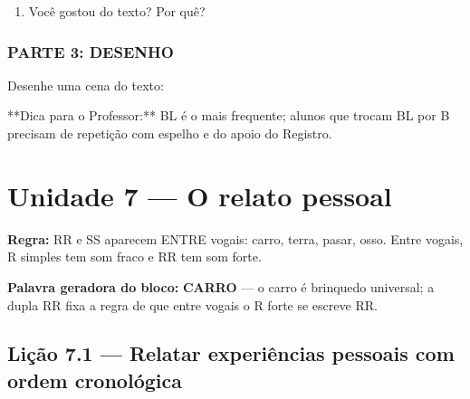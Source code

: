 \begin{exercicio}
\begin{enumerate}
  \item Você gostou do texto? Por quê?
  \begin{center}
  \underline{\hspace{12cm}}
  \end{center}

\end{enumerate}

\subsection*{PARTE 3: DESENHO}

Desenhe uma cena do texto:

\begin{center}
\end{center}

\end{exercicio}

\begin{dica}
**Dica para o Professor:** BL é o mais frequente; alunos que trocam BL por B precisam de repetição com espelho e do apoio do Registro.
\end{dica}


\chapter{Unidade 7 --- O relato pessoal}


\textbf{Regra:} RR e SS aparecem ENTRE vogais: carro, terra, pasar, osso. Entre vogais, R simples tem som fraco e RR tem som forte.

\textbf{Palavra geradora do bloco:} \textbf{CARRO} --- o carro é brinquedo universal; a dupla RR fixa a regra de que entre vogais o R forte se escreve RR.

\section{Lição 7.1 --- Relatar experiências pessoais com ordem cronológica}


